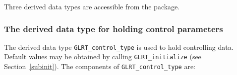 \documentclass{galahad}
\newcommand{\packagename}{GL\-RT}
\begin{document}




\galtypes
Three derived data types are accessible from the package.


\subsubsection{The derived data type for holding control
 parameters}\label{typecontrol}
The derived data type
{\tt \packagename\_control\_type}
is used to hold controlling data. Default values may be obtained by calling
{\tt \packagename\_initialize}
(see Section~\ref{subinit}). The components of
{\tt \packagename\_control\_type}
are:
\end{document}
